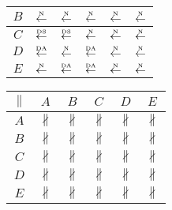 \begin{table}[htbp]
\begin{subtable}{1\textwidth}
\begin{minipage}[b]{0.3\textwidth}
\begin{tabular}{|c|c|c|c|c|c|}
        $B$ & $\overset{\text{\tiny{N}}}{\leftarrow}$ & $\overset{\text{\tiny{N}}}{\leftarrow}$ & $\overset{\text{\tiny{N}}}{\leftarrow}$ & $\overset{\text{\tiny{N}}}{\leftarrow}$ & $\overset{\text{\tiny{N}}}{\leftarrow}$\\ \hline
        $C$ & $\overset{\text{\tiny{DS}}}{\leftarrow}$ & $\overset{\text{\tiny{DS}}}{\leftarrow}$ & $\overset{\text{\tiny{N}}}{\leftarrow}$ & $\overset{\text{\tiny{N}}}{\leftarrow}$ & $\overset{\text{\tiny{N}}}{\leftarrow}$\\ \hline
        $D$ & $\overset{\text{\tiny{DA}}}{\leftarrow}$ & $\overset{\text{\tiny{N}}}{\leftarrow}$ & $\overset{\text{\tiny{DA}}}{\leftarrow}$ & $\overset{\text{\tiny{N}}}{\leftarrow}$ & $\overset{\text{\tiny{N}}}{\leftarrow}$\\ \hline
        $E$ & $\overset{\text{\tiny{N}}}{\leftarrow}$ & $\overset{\text{\tiny{DA}}}{\leftarrow}$ & $\overset{\text{\tiny{DA}}}{\leftarrow}$ & $\overset{\text{\tiny{N}}}{\leftarrow}$ & $\overset{\text{\tiny{N}}}{\leftarrow}$\\ \hline
      \end{tabular}
    \end{minipage}
    \begin{minipage}[b]{0.3\textwidth}
      \centering
      \begin{tabular}{|c|c|c|c|c|c|} \hline
        $\parallel$ & $A$ & $B$ & $C$ & $D$ & $E$\\ \hline
        $A$ & $\nparallel$ & $\nparallel$ & $\nparallel$ & $\nparallel$ & $\nparallel$\\ \hline
        $B$ & $\nparallel$ & $\nparallel$ & $\nparallel$ & $\nparallel$ & $\nparallel$\\ \hline
        $C$ & $\nparallel$ & $\nparallel$ & $\nparallel$ & $\nparallel$ & $\nparallel$\\ \hline
        $D$ & $\nparallel$ & $\nparallel$ & $\nparallel$ & $\nparallel$ & $\nparallel$\\ \hline
        $E$ & $\nparallel$ & $\nparallel$ & $\nparallel$ & $\nparallel$ & $\nparallel$\\ \hline
      \end{tabular}
    \end{minipage}
  \end{subtable}


\end{table}
